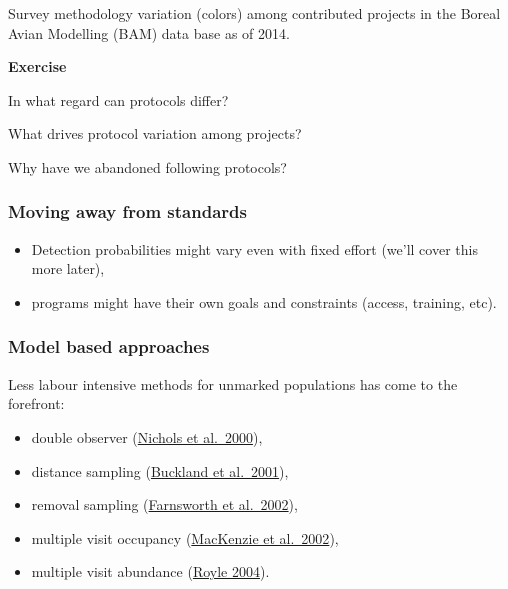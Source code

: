 \documentclass[12pt,]{book}
\providecommand{\tightlist}{%
  \setlength{\itemsep}{0pt}\setlength{\parskip}{0pt}}
\let\BeginKnitrBlock\begin \let\EndKnitrBlock\end
\begin{document}
Survey methodology variation (colors) among contributed projects
in the Boreal Avian Modelling (BAM) data base as of 2014.

\BeginKnitrBlock{rmdexercise}
\textbf{Exercise}

In what regard can protocols differ?

What drives protocol variation among projects?

Why have we abandoned following protocols?
\EndKnitrBlock{rmdexercise}

\hypertarget{moving-away-from-standards}{%
\subsubsection{Moving away from standards}\label{moving-away-from-standards}}

\begin{itemize}
\tightlist
\item
  Detection probabilities might vary even with fixed effort (we'll cover this more later),
\item
  programs might have their own goals and constraints (access, training, etc).
\end{itemize}

\hypertarget{model-based-approaches}{%
\subsubsection{Model based approaches}\label{model-based-approaches}}

Less labour intensive methods for unmarked populations has come to the forefront:

\begin{itemize}
\tightlist
\item
  double observer (\href{https://doi.org/10.1642/0004-8038(2000)117\%5B0393:ADOAFE\%5D2.0.CO;2}{Nichols et al.~2000}),
\item
  distance sampling (\href{https://global.oup.com/academic/product/introduction-to-distance-sampling-9780198509271}{Buckland et al.~2001}),
\item
  removal sampling (\href{https://doi.org/10.1642/0004-8038(2002)119\%5B0414:ARMFED\%5D2.0.CO;2}{Farnsworth et al.~2002}),
\item
  multiple visit occupancy (\href{https://doi.org/10.1890/0012-9658(2002)083\%5B2248:ESORWD\%5D2.0.CO;2}{MacKenzie et al.~2002}),
\item
  multiple visit abundance (\href{https://doi.org/10.1111/j.0006-341X.2004.00142.x}{Royle 2004}).
\end{itemize}
\end{document}

